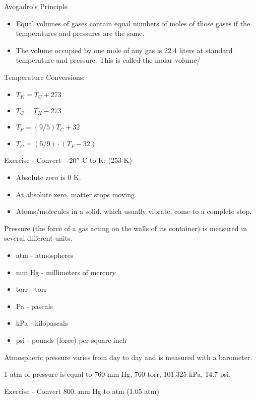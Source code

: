 \documentclass[../hchem.tex]{subfiles}
\begin{document}
Avogadro's Principle
\begin{itemize}
    \item Equal volumes of gases contain equal numbers of moles of those gases if the temperatures and pressures are the same.
    \item The volume occupied by one mole of any gas is 22.4 liters at standard temperature and pressure. This is called the molar volume/
\end{itemize}

Temperature Conversions:
\begin{itemize}
    \item $T_K = T_C +273$
    \item $T_C = T_K-273$
    \item $T_F = (9/5)T_C+32$
    \item $T_C = (5/9)\cdot (T_F-32)$
\end{itemize}

Exercise - Convert $-20\degree$ C to K: (253 K)

\begin{itemize}
    \item Absolute zero is 0 K.
    \item At absolute zero, matter stops moving.
    \item Atoms/molecules in a solid, which usually vibrate, come to a complete stop.
\end{itemize}

Pressure (the force of a gas acting on the walls of its container) is measured in several different units.
\begin{itemize}
    \item atm - atmospheres 
    \item mm Hg - millimeters of mercury 
    \item torr - torr
    \item Pa - pascals
    \item kPa - kilopascals 
    \item psi - pounds (force) per square inch
\end{itemize}

Atmospheric pressure varies from day to day and is measured with a barometer.

1 atm of pressure is equal to 760 mm Hg, 760 torr, 101.325 kPa, 14.7 psi.

Exercise - Convert 800. mm Hg to atm (1.05 atm)
\end{document}
